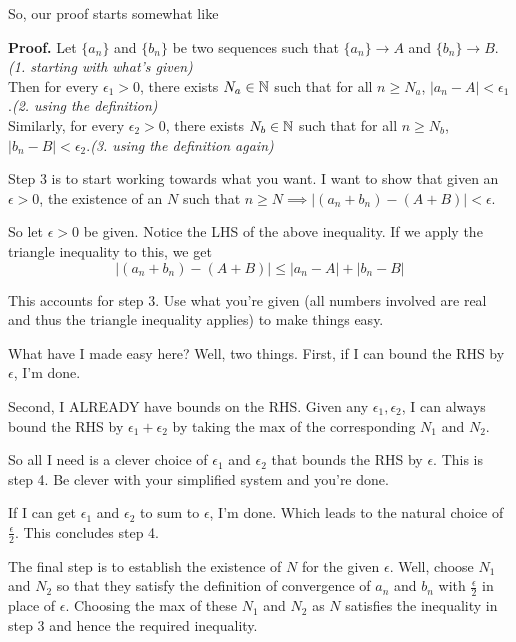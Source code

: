 So, our proof starts somewhat like
\begin{smrg}
    \textbf{Proof.} Let $\{a_n\}$ and $\{b_n\}$ be two sequences such that $\{a_n\} \rightarrow A$ and $\{b_n\} \rightarrow B$.\hfill{\footnotesize\itshape(1. starting with what's given)}\\
    Then for every $\epsilon_1 > 0$, there exists $N_a \in \mathbb{N}$ such that for all $n \geq N_a$, $|a_n - A| < \epsilon_1$.\hfill{\footnotesize\itshape(2. using the definition)}\\
    Similarly, for every $\epsilon_2 > 0$, there exists $N_b \in \mathbb{N}$ such that for all $n \geq N_b$, $|b_n - B| < \epsilon_2$.\hfill{\footnotesize\itshape(3. using the definition again)}\\
\end{smrg}

Step 3 is to start working towards what you want. I want to show that given an $\epsilon > 0$, the existence of an $N$ such that $n \geq N \implies |(a_n + b_n) - (A + B)| < \epsilon$.

So let $\epsilon > 0$ be given. Notice the LHS of the above inequality. If we apply the triangle inequality to this, we get $$|(a_n + b_n) - (A+B)| \leq |a_n - A| + |b_n - B|$$

This accounts for step 3. Use what you're given (all numbers involved are real and thus the triangle inequality applies) to make things easy.

What have I made easy here? Well, two things. First, if I can bound the RHS by $\epsilon$, I'm done.

Second, I ALREADY have bounds on the RHS. Given any $\epsilon_1, \epsilon_2$, I can always bound the RHS by $\epsilon_1 + \epsilon_2$ by taking the $\text{max}$ of the corresponding $N_1$ and $N_2$.

So all I need is a clever choice of $\epsilon_1$ and $\epsilon_2$ that bounds the RHS by $\epsilon$. This is step 4. Be clever with your simplified system and you're done.

If I can get $\epsilon_1$ and $\epsilon_2$ to sum to $\epsilon$, I'm done. Which leads to the natural choice of $\frac \epsilon 2$. This concludes step 4.

The final step is to establish the existence of $N$ for the given $\epsilon$. Well, choose $N_1$ and $N_2$ so that they satisfy the definition of convergence of $a_n$ and $b_n$ with $\frac \epsilon 2$ in place of $\epsilon$. Choosing the max of these $N_1$ and $N_2$ as $N$ satisfies the inequality in step 3 and hence the required inequality.

